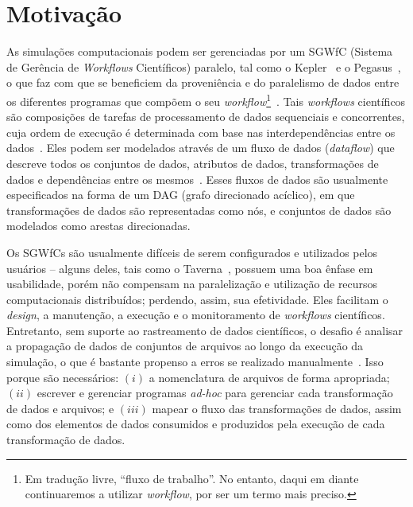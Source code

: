
\section{Motivação}%
\label{sec:motivacao}

As simulações computacionais podem ser gerenciadas por um  SGWfC (Sistema de Gerência de \textit{Workflows} Científicos) paralelo, tal como o Kepler~\cite{ludascher2006scientific} e o Pegasus~\cite{deelman2005pegasus}, o que faz com que se beneficiem da proveniência e do paralelismo de dados entre os diferentes programas que compõem o seu \textit{workflow}\footnote{Em tradução livre, ``fluxo de trabalho''. No entanto, daqui em diante continuaremos a utilizar \textit{workflow}, por ser um termo mais preciso.}~\cite{bux2013parallelization}.
Tais \textit{workflows} científicos são composições de tarefas de processamento de dados sequenciais e concorrentes, cuja ordem de execução é determinada com base nas interdependências entre os dados~\cite{bux2013parallelization}. Eles podem ser modelados através de um fluxo de dados (\textit{dataflow}) que descreve todos os conjuntos de dados, atributos de dados, transformações de dados e dependências entre os mesmos~\cite{silva2017raw}. Esses fluxos de dados são usualmente especificados na forma de um  DAG (grafo direcionado acíclico), em que transformações de dados são representadas como nós, e conjuntos de dados são modelados como arestas direcionadas.

Os SGWfCs são usualmente difíceis de serem configurados e utilizados pelos usuários -- alguns deles, tais como o Taverna~\cite{hull2006taverna}, possuem uma boa ênfase em usabilidade, porém não compensam na paralelização e utilização de recursos computacionais distribuídos; perdendo, assim, sua efetividade.
Eles facilitam o \textit{design}, a manutenção, a execução e o monitoramento de \textit{workflows} científicos. Entretanto, sem suporte ao rastreamento de dados científicos, o desafio é analisar a propagação de dados de conjuntos de arquivos ao longo da execução da simulação, o que é bastante propenso a erros se realizado manualmente~\cite{silva2015analyzing}. Isso porque são necessários: \( (i) \) a nomenclatura de arquivos de forma apropriada; \( (ii) \) escrever e gerenciar programas \textit{ad-hoc} para gerenciar cada transformação de dados e arquivos; e \( (iii) \) mapear o fluxo das transformações de dados, assim como dos elementos de dados consumidos e produzidos pela execução de cada transformação de dados.

